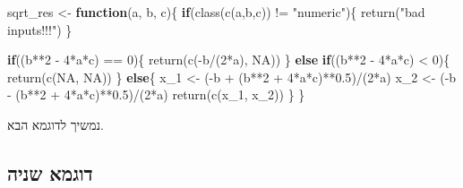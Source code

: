 \documentclass[
]{book}
\newenvironment{Shaded}{\begin{snugshade}}{\end{snugshade}}
\newcommand{\ConstantTok}[1]{\textcolor[rgb]{0.00,0.00,0.00}{#1}}
\newcommand{\ControlFlowTok}[1]{\textcolor[rgb]{0.13,0.29,0.53}{\textbf{#1}}}
\newcommand{\DecValTok}[1]{\textcolor[rgb]{0.00,0.00,0.81}{#1}}
\newcommand{\FloatTok}[1]{\textcolor[rgb]{0.00,0.00,0.81}{#1}}
\newcommand{\FunctionTok}[1]{\textcolor[rgb]{0.00,0.00,0.00}{#1}}
\newcommand{\NormalTok}[1]{#1}
\newcommand{\OtherTok}[1]{\textcolor[rgb]{0.56,0.35,0.01}{#1}}
\newcommand{\SpecialCharTok}[1]{\textcolor[rgb]{0.00,0.00,0.00}{#1}}
\newcommand{\StringTok}[1]{\textcolor[rgb]{0.31,0.60,0.02}{#1}}
\begin{document}
\begin{Shaded}
\begin{Highlighting}[]
\NormalTok{sqrt\_res }\OtherTok{\textless{}{-}} \ControlFlowTok{function}\NormalTok{(a, b, c)\{}
  \ControlFlowTok{if}\NormalTok{(}\FunctionTok{class}\NormalTok{(}\FunctionTok{c}\NormalTok{(a,b,c)) }\SpecialCharTok{!=} \StringTok{"numeric"}\NormalTok{)\{}
    \FunctionTok{return}\NormalTok{(}\StringTok{"bad inputs!!!"}\NormalTok{)}
\NormalTok{  \}}
  
  \ControlFlowTok{if}\NormalTok{((b}\SpecialCharTok{**}\DecValTok{2} \SpecialCharTok{{-}} \DecValTok{4}\SpecialCharTok{*}\NormalTok{a}\SpecialCharTok{*}\NormalTok{c) }\SpecialCharTok{==} \DecValTok{0}\NormalTok{)\{}
    \FunctionTok{return}\NormalTok{(}\FunctionTok{c}\NormalTok{(}\SpecialCharTok{{-}}\NormalTok{b}\SpecialCharTok{/}\NormalTok{(}\DecValTok{2}\SpecialCharTok{*}\NormalTok{a), }\ConstantTok{NA}\NormalTok{))}
\NormalTok{  \} }\ControlFlowTok{else} \ControlFlowTok{if}\NormalTok{((b}\SpecialCharTok{**}\DecValTok{2} \SpecialCharTok{{-}} \DecValTok{4}\SpecialCharTok{*}\NormalTok{a}\SpecialCharTok{*}\NormalTok{c) }\SpecialCharTok{\textless{}} \DecValTok{0}\NormalTok{)\{}
    \FunctionTok{return}\NormalTok{(}\FunctionTok{c}\NormalTok{(}\ConstantTok{NA}\NormalTok{, }\ConstantTok{NA}\NormalTok{))}
\NormalTok{  \} }\ControlFlowTok{else}\NormalTok{\{}
\NormalTok{    x\_1 }\OtherTok{\textless{}{-}}\NormalTok{ (}\SpecialCharTok{{-}}\NormalTok{b }\SpecialCharTok{+}\NormalTok{ (b}\SpecialCharTok{**}\DecValTok{2} \SpecialCharTok{+} \DecValTok{4}\SpecialCharTok{*}\NormalTok{a}\SpecialCharTok{*}\NormalTok{c)}\SpecialCharTok{**}\FloatTok{0.5}\NormalTok{)}\SpecialCharTok{/}\NormalTok{(}\DecValTok{2}\SpecialCharTok{*}\NormalTok{a)}
\NormalTok{    x\_2 }\OtherTok{\textless{}{-}}\NormalTok{ (}\SpecialCharTok{{-}}\NormalTok{b }\SpecialCharTok{{-}}\NormalTok{ (b}\SpecialCharTok{**}\DecValTok{2} \SpecialCharTok{+} \DecValTok{4}\SpecialCharTok{*}\NormalTok{a}\SpecialCharTok{*}\NormalTok{c)}\SpecialCharTok{**}\FloatTok{0.5}\NormalTok{)}\SpecialCharTok{/}\NormalTok{(}\DecValTok{2}\SpecialCharTok{*}\NormalTok{a)}
    \FunctionTok{return}\NormalTok{(}\FunctionTok{c}\NormalTok{(x\_1, x\_2))}
\NormalTok{  \}}
\NormalTok{\}}
\end{Highlighting}
\end{Shaded}

נמשיך לדוגמא הבא.

\hypertarget{ux5d3ux5d5ux5d2ux5deux5d0-ux5e9ux5e0ux5d9ux5d4}{%
\subsection{דוגמא שניה}\label{ux5d3ux5d5ux5d2ux5deux5d0-ux5e9ux5e0ux5d9ux5d4}}
\end{document}

